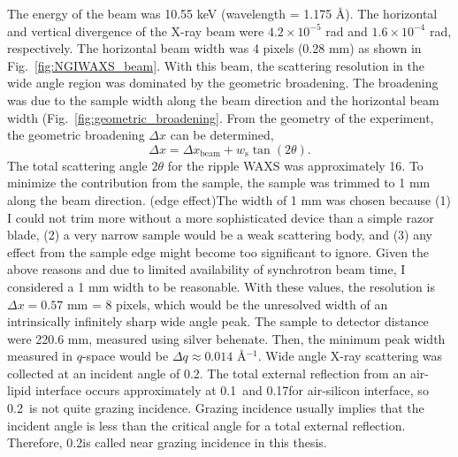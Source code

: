 The energy of the beam was 10.55 keV (wavelength = 1.175 \AA).
The horizontal and vertical divergence of the X-ray beam were
$4.2 \times 10^{-5}$ rad and $1.6 \times 10^{-4}$ rad, respectively. 
The horizontal beam width was 4 pixels (0.28 mm) as shown in
Fig.~\ref{fig:NGIWAXS_beam}.
With this beam, the scattering resolution in the wide angle region 
was dominated by the geometric broadening. The broadening was due to the
sample width along the beam direction and the horizontal beam width 
(Fig.~\ref{fig:geometric_broadening}. From the geometry of the experiment, 
the geometric broadening $\Delta x$ can be determined,
\[
\Delta x = \Delta x_\textrm{beam} + w_\textrm{s}\tan(2\theta).
\] 
The total scattering angle $2\theta$ for the ripple WAXS was approximately 
16\textdegree. 
To minimize the contribution from the sample, the sample was trimmed to 1 mm
along the beam direction. 
(edge effect)The width of 1 mm was chosen because (1) I could not trim more
without a more sophisticated device than a simple razor blade, (2) a very
narrow sample would be a weak scattering body, and (3) any effect from 
the sample edge might become too significant to ignore. 
Given the above reasons and due to limited availability
of synchrotron beam time, I considered a 1 mm width to be reasonable.
With these values, the resolution is $\Delta x = 0.57$ mm = 8 pixels, 
which would be the unresolved width of an intrinsically infinitely sharp wide angle peak.
The sample to detector distance were 220.6 mm, measured using silver behenate.
Then, the minimum peak width measured in $q$-space would be
$\Delta q \approx 0.014$ \AA$^{-1}$.
Wide angle X-ray scattering was collected at an incident angle of 0.2\textdegree. 
The total external reflection from an air-lipid interface occurs approximately 
at 0.1\textdegree\ and 0.17\textdegree for air-silicon interface, 
so 0.2\textdegree\ is not quite grazing incidence.
Grazing incidence usually implies that the incident angle is less than the 
critical angle for a total external reflection.
Therefore, 0.2\textdegree is called near grazing incidence in this thesis.


